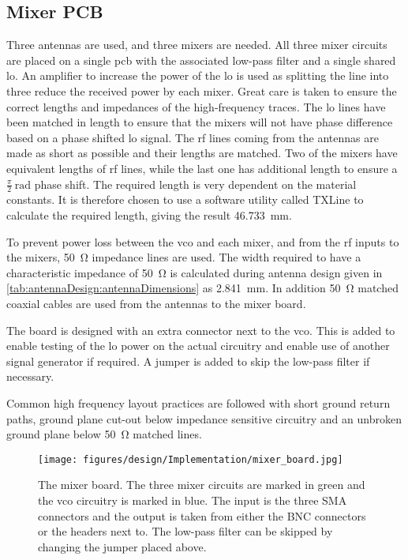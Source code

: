 \subsection{Mixer PCB} \label{sec:mixer_pcb}
Three antennas are used, and three mixers are needed. All three mixer circuits are placed on a single \gls{pcb} with the associated low-pass filter and a single shared \gls{lo}. An amplifier to increase the power of the \gls{lo} is used as splitting the line into three reduce the received power by each mixer.
Great care is taken to ensure the correct lengths and impedances of the high-frequency traces. The \gls{lo} lines have been matched in length to ensure that the mixers will not have phase difference based on a phase shifted \gls{lo} signal. The \gls{rf} lines coming from the antennas are made as short as possible and their lengths are matched. Two of the mixers have equivalent lengths of \gls{rf} lines, while the last one has additional length to ensure a $\frac{\pi}{2}~\si{\radian}$ phase shift. The required length is very dependent on the material constants. It is therefore chosen to use a software utility called TXLine to calculate the required length, giving the result \SI{46.733}{\milli\meter}.

To prevent power loss between the \gls{vco} and each mixer, and from the \gls{rf} inputs to the mixers, \SI{50}{\ohm} impedance lines are used. The width required to have a characteristic impedance of \SI{50}{\ohm} is calculated during antenna design given in \autoref{tab:antennaDesign:antennaDimensions} as \SI{2.841}{\milli\meter}. In addition \SI{50}{\ohm} matched coaxial cables are used from the antennas to the mixer board.

The board is designed with an extra connector next to the \gls{vco}. This is added to enable testing of the \gls{lo} power on the actual circuitry and enable use of another signal generator if required. A jumper is added to skip the low-pass filter if necessary.

Common high frequency layout practices are followed with short ground return paths, ground plane cut-out below impedance sensitive circuitry and an unbroken ground plane below \SI{50}{\ohm} matched lines.

\begin{figure}
	\centering
	\texttt{[image: figures/design/Implementation/mixer\_board.jpg]}
	\label{fig:mixer_board}
	\caption{The mixer board. The three mixer circuits are marked in green and the \gls{vco} circuitry is marked in blue. The input is the three SMA connectors and the output is taken from either the BNC connectors or the headers next to. The low-pass filter can be skipped by changing the jumper placed above.}
\end{figure}

